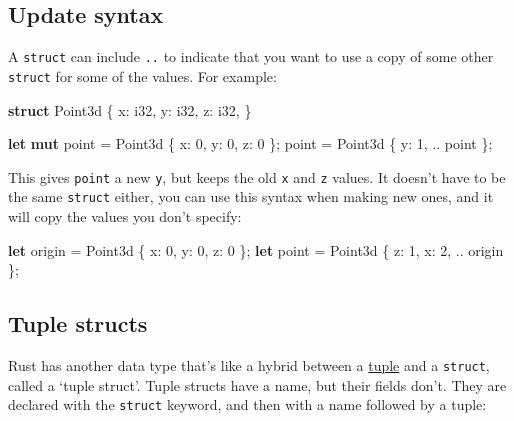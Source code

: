 \documentclass[a4paper,]{book}
\newenvironment{Shaded}{\begin{snugshade}}{\end{snugshade}}
\newcommand{\KeywordTok}[1]{\textcolor[rgb]{0.13,0.29,0.53}{\textbf{{#1}}}}
\newcommand{\DataTypeTok}[1]{\textcolor[rgb]{0.13,0.29,0.53}{{#1}}}
\newcommand{\DecValTok}[1]{\textcolor[rgb]{0.00,0.00,0.81}{{#1}}}
\newcommand{\NormalTok}[1]{{#1}}
\begin{document}
\subsection{Update syntax}\label{update-syntax}

A \texttt{struct} can include \texttt{..} to indicate that you want to
use a copy of some other \texttt{struct} for some of the values. For
example:

\begin{Shaded}
\begin{Highlighting}[]
\KeywordTok{struct} \NormalTok{Point3d \{}
    \NormalTok{x: }\DataTypeTok{i32}\NormalTok{,}
    \NormalTok{y: }\DataTypeTok{i32}\NormalTok{,}
    \NormalTok{z: }\DataTypeTok{i32}\NormalTok{,}
\NormalTok{\}}

\KeywordTok{let} \KeywordTok{mut} \NormalTok{point = Point3d \{ x: }\DecValTok{0}\NormalTok{, y: }\DecValTok{0}\NormalTok{, z: }\DecValTok{0} \NormalTok{\};}
\NormalTok{point = Point3d \{ y: }\DecValTok{1}\NormalTok{, .. point \};}
\end{Highlighting}
\end{Shaded}

This gives \texttt{point} a new \texttt{y}, but keeps the old \texttt{x}
and \texttt{z} values. It doesn't have to be the same \texttt{struct}
either, you can use this syntax when making new ones, and it will copy
the values you don't specify:

\begin{Shaded}
\begin{Highlighting}[]
\KeywordTok{let} \NormalTok{origin = Point3d \{ x: }\DecValTok{0}\NormalTok{, y: }\DecValTok{0}\NormalTok{, z: }\DecValTok{0} \NormalTok{\};}
\KeywordTok{let} \NormalTok{point = Point3d \{ z: }\DecValTok{1}\NormalTok{, x: }\DecValTok{2}\NormalTok{, .. origin \};}
\end{Highlighting}
\end{Shaded}

\subsection{Tuple structs}\label{tuple-structs}

Rust has another data type that's like a hybrid between a
\protect\hyperlink{tuples}{tuple} and a \texttt{struct}, called a `tuple
struct'. Tuple structs have a name, but their fields don't. They are
declared with the \texttt{struct} keyword, and then with a name followed
by a tuple:
\end{document}
